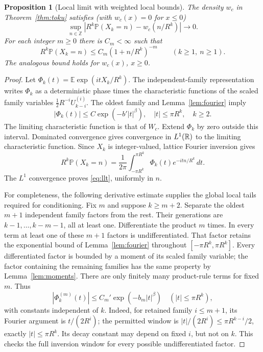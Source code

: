 \documentclass[11pt,a4paper]{article}
\newtheorem{proposition}[theorem]{Proposition}
\theoremstyle{remark}\newtheorem{remark}[theorem]{Remark}
\newcommand{\E}{\mathbb E}\newcommand{\Pp}{\mathbb P}
\begin{document}
\begin{proposition}[Local limit with weighted local bounds]\label{prop:llt}
The density $w_c$ in Theorem~\ref{thm:toku} satisfies
\textnormal{(with $w_c(x)=0$ for $x\le0$)}
\begin{equation}\label{eq:llt}
\sup_{n\in\mathbb Z}\left|R^k\Pp(X_k=n)-w_c(n/R^k)\right|\longrightarrow0.
\end{equation}
For each integer $m\ge0$ there is $C_m<\infty$ such that
\begin{equation}\label{eq:localtail}
R^k\Pp(X_k=n)\le C_m(1+n/R^k)^{-m}
\qquad(k\ge1,\ n\ge1).
\end{equation}
The analogous bound holds for $w_c(x)$, $x\ge0$.
\end{proposition}
\begin{proof}
Let $\Phi_k(t)=\E\exp(itX_k/R^k)$. The independent-family representation writes $\Phi_k$ as a deterministic phase times the characteristic functions of the scaled family variables $\frac12R^{-i}U_{k-i}^{(i)}$. The oldest family and Lemma~\ref{lem:fourier} imply
\begin{equation}\label{eq:phibound}
|\Phi_k(t)|\le C\exp(-b'|t|^\beta),
\quad |t|\le\pi R^k,\quad k\ge2.
\end{equation}
The limiting characteristic function is that of $W_c$. Extend $\Phi_k$ by zero outside this interval. Dominated convergence gives convergence in $L^1(\mathbb R)$ to the limiting characteristic function. Since $X_k$ is integer-valued, lattice Fourier inversion gives
\[
R^k\Pp(X_k=n)=\frac1{2\pi}\int_{-\pi R^k}^{\pi R^k}
\Phi_k(t)e^{-itn/R^k}\,dt.
\]
The $L^1$ convergence proves \eqref{eq:llt}, uniformly in $n$.

For completeness, the following derivative estimate supplies the global local tails required for conditioning. Fix $m$ and suppose $k\ge m+2$. Separate the oldest $m+1$ independent family factors from the rest. Their generations are $k-1,\ldots,k-m-1$, all at least one. Differentiate the product $m$ times. In every term at least one of these $m+1$ factors is undifferentiated. That factor retains the exponential bound of Lemma~\ref{lem:fourier} throughout $[-\pi R^k,\pi R^k]$. Every differentiated factor is bounded by a moment of its scaled family variable; the factor containing the remaining families has the same property by Lemma~\ref{lem:moments}. There are only finitely many product-rule terms for fixed $m$. Thus
\begin{equation}\label{eq:derivativebound}
|\Phi_k^{(m)}(t)|\le C_m'\exp(-b_m|t|^\beta)
\quad (|t|\le\pi R^k),
\end{equation}
with constants independent of $k$.
Indeed, for retained family $i\le m+1$, its Fourier argument is $t/(2R^i)$; the permitted window is $|t|/(2R^i)\le\pi R^{k-i}/2$, exactly $|t|\le\pi R^k$. Its decay constant may depend on fixed $i$, but not on $k$. This checks the full inversion window for every possible undifferentiated factor.


\end{proof}
\end{document}
